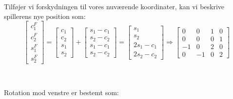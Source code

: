 \documentclass[a4paper,12pt]{article}
\begin{document}
Tilføjer vi forskydningen til vores nuværende koordinater, kan vi beskrive spillerens nye position som:\\

\[
\left[\begin{array}{ccc}
    c^F_1\\
    c^F_2\\
    s^F_1\\
    s^F_2
\end{array}\right]
=
\left[\begin{array}{ccc}
    c_1\\
    c_2\\
    s_1\\
    s_2
\end{array}\right]
+
\left[\begin{array}{ccc}
    s_1-c_1\\
    s_2-c_2\\
    s_1-c_1\\
    s_2-c_2
\end{array}\right]
=
\left[\begin{array}{ccc}
    s_1\\
    s_2\\
    2s_1-c_1\\
    2s_2-c_2
\end{array}\right]
\Rightarrow
\left[\begin{array}{cccc}
    0 & 0 & 1 & 0\\
    0 & 0 & 0 & 1\\
    -1 & 0 & 2 & 0\\
    0 & -1 & 0 & 2
\end{array}\right]
\]\\


\subsection{}
Rotation mod venstre er bestemt som:\\
\end{document}
